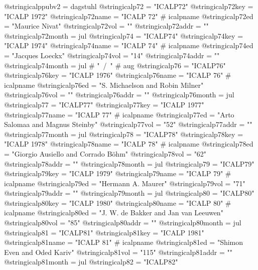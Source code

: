 @string{icalppubv2 =            dagstuhl}
@string{icalp72 =               "ICALP72"}
@string{icalp72key =            "ICALP 1972"}
@string{icalp72name =           "ICALP 72" # icalpname}
@string{icalp72ed =             "Maurice Nivat"}
@string{icalp72vol =            ""}
@string{icalp72addr =           ""}
@string{icalp72month =          jul}
@string{icalp74 =               "ICALP74"}
@string{icalp74key =            "ICALP 1974"}
@string{icalp74name =           "ICALP 74" # icalpname}
@string{icalp74ed =             "Jacques Loeckx"}
@string{icalp74vol =            "14"}
@string{icalp74addr =           ""}
@string{icalp74month =          jul # "~/~" # aug}
@string{icalp76 =               "ICALP76"}
@string{icalp76key =            "ICALP 1976"}
@string{icalp76name =           "ICALP 76" # icalpname}
@string{icalp76ed =             "S. Michaelson and Robin Milner"}
@string{icalp76vol =            ""}
@string{icalp76addr =           ""}
@string{icalp76month =          jul}
@string{icalp77 =               "ICALP77"}
@string{icalp77key =            "ICALP 1977"}
@string{icalp77name =           "ICALP 77" # icalpname}
@string{icalp77ed =             "Arto Salomaa and Magnus Steinby"}
@string{icalp77vol =            "52"}
@string{icalp77addr =           ""}
@string{icalp77month =          jul}
@string{icalp78 =               "ICALP78"}
@string{icalp78key =            "ICALP 1978"}
@string{icalp78name =           "ICALP 78" # icalpname}
@string{icalp78ed =             "Giorgio Ausiello and Corrado B{\"o}hm"}
@string{icalp78vol =            "62"}
@string{icalp78addr =           ""}
@string{icalp78month =          jul}
@string{icalp79 =               "ICALP79"}
@string{icalp79key =            "ICALP 1979"}
@string{icalp79name =           "ICALP 79" # icalpname}
@string{icalp79ed =             "Hermann A. Maurer"}
@string{icalp79vol =            "71"}
@string{icalp79addr =           ""}
@string{icalp79month =          jul}
@string{icalp80 =               "ICALP80"}
@string{icalp80key =            "ICALP 1980"}
@string{icalp80name =           "ICALP 80" # icalpname}
@string{icalp80ed =             "J. W. {de Bakker} and Jan {van Leeuwen}"}
@string{icalp80vol =            "85"}
@string{icalp80addr =           ""}
@string{icalp80month =          jul}
@string{icalp81 =               "ICALP81"}
@string{icalp81key =            "ICALP 1981"}
@string{icalp81name =           "ICALP 81" # icalpname}
@string{icalp81ed =             "Shimon Even and Oded Kariv"}
@string{icalp81vol =            "115"}
@string{icalp81addr =           ""}
@string{icalp81month =          jul}
@string{icalp82 =               "ICALP82"}
